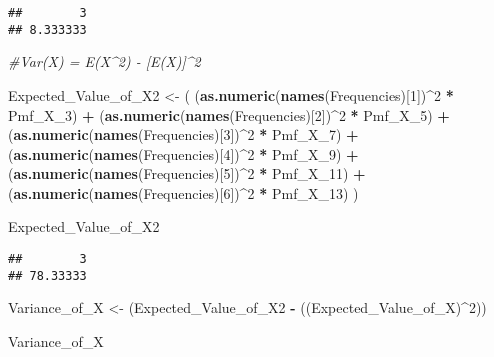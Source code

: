 \documentclass[
]{article}
\newenvironment{Shaded}{\begin{snugshade}}{\end{snugshade}}
\newcommand{\CommentTok}[1]{\textcolor[rgb]{0.56,0.35,0.01}{\textit{#1}}}
\newcommand{\DecValTok}[1]{\textcolor[rgb]{0.00,0.00,0.81}{#1}}
\newcommand{\FunctionTok}[1]{\textcolor[rgb]{0.13,0.29,0.53}{\textbf{#1}}}
\newcommand{\NormalTok}[1]{#1}
\newcommand{\OtherTok}[1]{\textcolor[rgb]{0.56,0.35,0.01}{#1}}
\newcommand{\SpecialCharTok}[1]{\textcolor[rgb]{0.81,0.36,0.00}{\textbf{#1}}}
\begin{document}
\begin{verbatim}
##        3 
## 8.333333
\end{verbatim}

\begin{Shaded}
\begin{Highlighting}[]
\CommentTok{\#Var(X) = E(X\^{}2) {-} [E(X)]\^{}2}

\NormalTok{Expected\_Value\_of\_X2 }\OtherTok{\textless{}{-}}\NormalTok{ (}
\NormalTok{  (}\FunctionTok{as.numeric}\NormalTok{(}\FunctionTok{names}\NormalTok{(Frequencies)[}\DecValTok{1}\NormalTok{])}\SpecialCharTok{\^{}}\DecValTok{2} \SpecialCharTok{*}\NormalTok{ Pmf\_X\_3) }\SpecialCharTok{+} 
\NormalTok{  (}\FunctionTok{as.numeric}\NormalTok{(}\FunctionTok{names}\NormalTok{(Frequencies)[}\DecValTok{2}\NormalTok{])}\SpecialCharTok{\^{}}\DecValTok{2} \SpecialCharTok{*}\NormalTok{ Pmf\_X\_5) }\SpecialCharTok{+} 
\NormalTok{  (}\FunctionTok{as.numeric}\NormalTok{(}\FunctionTok{names}\NormalTok{(Frequencies)[}\DecValTok{3}\NormalTok{])}\SpecialCharTok{\^{}}\DecValTok{2} \SpecialCharTok{*}\NormalTok{ Pmf\_X\_7) }\SpecialCharTok{+}
\NormalTok{  (}\FunctionTok{as.numeric}\NormalTok{(}\FunctionTok{names}\NormalTok{(Frequencies)[}\DecValTok{4}\NormalTok{])}\SpecialCharTok{\^{}}\DecValTok{2} \SpecialCharTok{*}\NormalTok{ Pmf\_X\_9) }\SpecialCharTok{+} 
\NormalTok{  (}\FunctionTok{as.numeric}\NormalTok{(}\FunctionTok{names}\NormalTok{(Frequencies)[}\DecValTok{5}\NormalTok{])}\SpecialCharTok{\^{}}\DecValTok{2} \SpecialCharTok{*}\NormalTok{ Pmf\_X\_11) }\SpecialCharTok{+} 
\NormalTok{  (}\FunctionTok{as.numeric}\NormalTok{(}\FunctionTok{names}\NormalTok{(Frequencies)[}\DecValTok{6}\NormalTok{])}\SpecialCharTok{\^{}}\DecValTok{2} \SpecialCharTok{*}\NormalTok{ Pmf\_X\_13)}
\NormalTok{)}

\NormalTok{Expected\_Value\_of\_X2}
\end{Highlighting}
\end{Shaded}

\begin{verbatim}
##        3 
## 78.33333
\end{verbatim}

\begin{Shaded}
\begin{Highlighting}[]
\NormalTok{Variance\_of\_X }\OtherTok{\textless{}{-}}\NormalTok{ (Expected\_Value\_of\_X2 }\SpecialCharTok{{-}}\NormalTok{ ((Expected\_Value\_of\_X)}\SpecialCharTok{\^{}}\DecValTok{2}\NormalTok{))}

\NormalTok{Variance\_of\_X}
\end{Highlighting}
\end{Shaded}
\end{document}
